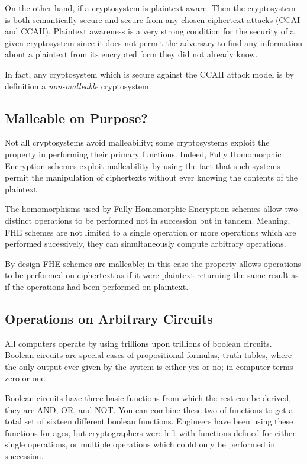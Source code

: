 On the other hand, if a cryptosystem is plaintext aware. Then the cryptosystem is both semantically secure and secure from any chosen-ciphertext attacks (CCAI and CCAII). Plaintext awareness is a very strong condition for the security of a given cryptosystem since it does not permit the adversary to find any information about a plaintext from its encrypted form they did not already know. 

In fact, any cryptosystem which is secure against the CCAII attack model is by definition a \emph{non-malleable} cryptosystem.

\subsection{Malleable on Purpose?}

Not all cryptosystems avoid malleability; some cryptosystems exploit the property in performing their primary functions. Indeed, Fully Homomorphic Encryption schemes exploit malleability by using the fact that such systems permit the manipulation of ciphertexts without ever knowing the contents of the plaintext. 

The homomorphisms used by Fully Homomorphic Encryption schemes allow two distinct operations to be performed not in succession but in tandem. Meaning, FHE schemes are not limited to a single operation or more operations which are performed sucessively, they can simultaneously compute arbitrary operations. 

By design FHE schemes are malleable; in this case the property allows operations to be performed on ciphertext as if it were plaintext returning the same result as if the operations had been performed on plaintext.

\subsection{Operations on Arbitrary Circuits}

All computers operate by using trillions upon trillions of boolean circuits. Boolean circuits are special cases of propositional formulas, truth tables, where the only output ever given by the system is either yes or no; in computer terms zero or one. 

Boolean circuits have three basic functions from which the rest can be derived, they are AND, OR, and NOT. You can combine these two of functions to get a total set of sixteen different boolean functions. Engineers have been using these functions for ages, but cryptographers were left with functions defined for either single operations, or multiple operations which could only be performed in succession. 


